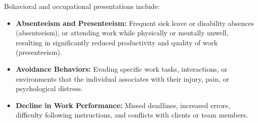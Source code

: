Behavioral and occupational presentations include:
\begin{itemize}
    \item \textbf{Absenteeism and Presenteeism:} Frequent sick leave or disability absences (absenteeism), or attending work while physically or mentally unwell, resulting in significantly reduced productivity and quality of work (presenteeism).
    \item \textbf{Avoidance Behaviors:} Evading specific work tasks, interactions, or environments that the individual associates with their injury, pain, or psychological distress.
    \item \textbf{Decline in Work Performance:} Missed deadlines, increased errors, difficulty following instructions, and conflicts with clients or team members.
\end{itemize}

